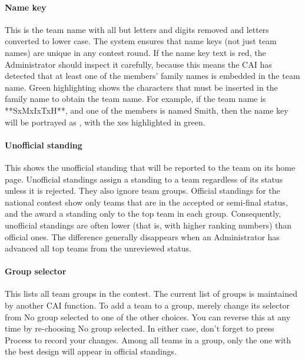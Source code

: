 \documentclass[11pt,letterpaper]{refart}
\def\ui#1{\textsf{#1}}
\begin{document}
\paragraph{Name key}
This is the team name
with all but letters and digits removed and letters converted to lower case. The
system ensures that name keys (not just team names) are unique in any contest 
round. If the name key text is red, the Administrator
should inspect it carefully, because this means the CAI has detected that at
least one of the members' family names is embedded in the team name.  Green
highlighting shows the characters that must be inserted in the family name to
obtain the team name. For example, if the team name is \ui{**SxMxIxTxH**}, and
one of the members is named Smith, then the name key will be portrayed as
\ui{\color{red}{sxmxixtxh}}, with the \ui{x}es highlighted in green.

\paragraph{Unofficial standing}
This shows the unofficial standing that will be reported to the team on its home
page.  Unofficial standings assign a standing to a team regardless of its status 
unless it is rejected. They also ignore team groups.  Official standings for 
the national contest show only teams
that are in the accepted or semi-final status, and the award a standing only to
the top team in each group. Consequently, unofficial standings are often
lower (that is, with higher ranking numbers) than official ones. The 
difference generally disappears when an Administrator has advanced all top 
teams from the unreviewed status.

\paragraph{Group selector}
This lists all team groups in the contest. The current list
of groups is maintained by another CAI function.
To add a team to a group, merely 
change its selector from \ui{No group selected} to one of the other choices.  You 
can reverse this at any time by re-choosing \ui{No group selected}.  In either case,
don't forget to press \ui{Process} to record your changes.  Among all teams
in a group, only the one with the best design will
appear in official standings.
\end{document}
